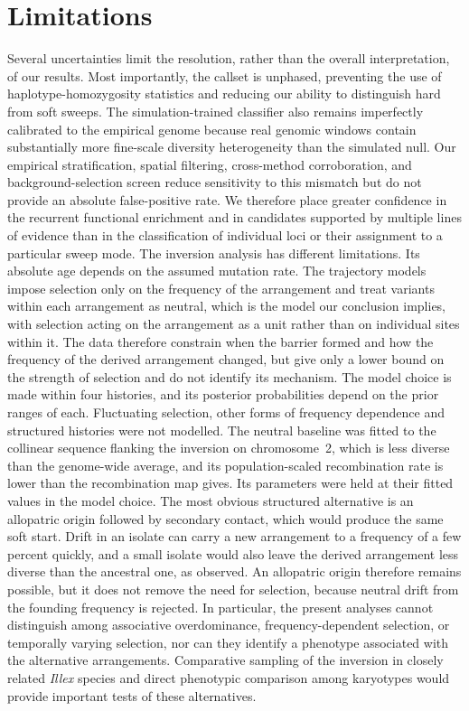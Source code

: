 \documentclass[11pt]{article}
\begin{document}
\section{Limitations}
Several uncertainties limit the resolution, rather than the overall interpretation, of our results. Most importantly, the callset is unphased, preventing the use of haplotype-homozygosity statistics and reducing our ability to distinguish hard from soft sweeps. The simulation-trained classifier also remains imperfectly calibrated to the empirical genome because real genomic windows contain substantially more fine-scale diversity heterogeneity than the simulated null. Our empirical stratification, spatial filtering, cross-method corroboration, and background-selection screen reduce sensitivity to this mismatch but do not provide an absolute false-positive rate. We therefore place greater confidence in the recurrent functional enrichment and in candidates supported by multiple lines of evidence than in the classification of individual loci or their assignment to a particular sweep mode.
The inversion analysis has different limitations. Its absolute age depends on the assumed mutation rate. The trajectory models impose selection only on the frequency of the arrangement and treat variants within each arrangement as neutral, which is the model our conclusion implies, with selection acting on the arrangement as a unit rather than on individual sites within it. The data therefore constrain when the barrier formed and how the frequency of the derived arrangement changed, but give only a lower bound on the strength of selection and do not identify its mechanism. The model choice is made within four histories, and its posterior probabilities depend on the prior ranges of each. Fluctuating selection, other forms of frequency dependence and structured histories were not modelled. The neutral baseline was fitted to the collinear sequence flanking the inversion on chromosome~2, which is less diverse than the genome-wide average, and its population-scaled recombination rate is lower than the recombination map gives. Its parameters were held at their fitted values in the model choice. The most obvious structured alternative is an allopatric origin followed by secondary contact, which would produce the same soft start. Drift in an isolate can carry a new arrangement to a frequency of a few percent quickly, and a small isolate would also leave the derived arrangement less diverse than the ancestral one, as observed. An allopatric origin therefore remains possible, but it does not remove the need for selection, because neutral drift from the founding frequency is rejected. In particular, the present analyses cannot distinguish among associative overdominance, frequency-dependent selection, or temporally varying selection, nor can they identify a phenotype associated with the alternative arrangements. Comparative sampling of the inversion in closely related \textit{Illex} species and direct phenotypic comparison among karyotypes would provide important tests of these alternatives.
\end{document}
